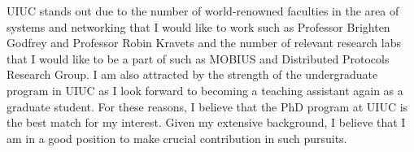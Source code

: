 \documentclass[11pt]{article}
\begin{document}
%

UIUC stands out due to the number of world-renowned faculties in the area of systems and networking that I would like to work such as Professor Brighten Godfrey and Professor Robin Kravets and the number of relevant research labs that I would like to be a part of such as MOBIUS and Distributed Protocols Research Group. I am also attracted by the strength of the undergraduate program in UIUC as I look forward to becoming a teaching assistant again as a graduate student. For these reasons, I believe that the PhD program at UIUC is the best match for my interest. Given my extensive background, I believe that I am in a good position to make crucial contribution in such pursuits. \newline



\end{document}
